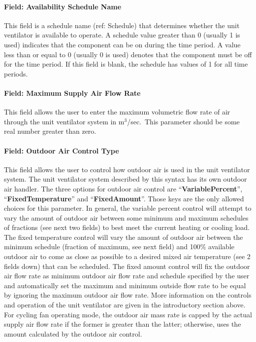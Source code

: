 \paragraph{Field: Availability Schedule Name}\label{field-availability-schedule-name-2-009}

This field is a schedule name (ref: Schedule) that determines whether the unit ventilator is available to operate. A schedule value greater than 0 (usually 1 is used) indicates that the component can be on during the time period. A value less than or equal to 0 (usually 0 is used) denotes that the component must be off for the time period. If this field is blank, the schedule has values of 1 for all time periods.

\paragraph{Field: Maximum Supply Air Flow Rate}\label{field-maximum-supply-air-flow-rate-1}

This field allows the user to enter the maximum volumetric flow rate of air through the unit ventilator system in m\(^{3}\)/sec.~This parameter should be some real number greater than zero.

\paragraph{Field: Outdoor Air Control Type}\label{field-outdoor-air-control-type-000}

This field allows the user to control how outdoor air is used in the unit ventilator system. The unit ventilator system described by this syntax has its own outdoor air handler. The three options for outdoor air control are ``\textbf{VariablePercent}'', ``\textbf{FixedTemperature}'' and ``\textbf{FixedAmount}''. Those keys are the only allowed choices for this parameter. In general, the variable percent control will attempt to vary the amount of outdoor air between some minimum and maximum schedules of fractions (see next two fields) to best meet the current heating or cooling load. The fixed temperature control will vary the amount of outdoor air between the minimum schedule (fraction of maximum, see next field) and 100\% available outdoor air to come as close as possible to a desired mixed air temperature (see 2 fields down) that can be scheduled. The fixed amount control will fix the outdoor air flow rate as minimum outdoor air flow rate and schedule specified by the user and automatically set the maximum and minimum outside flow rate to be equal by ignoring the maximum outdoor air flow rate. More information on the controls and operation of the unit ventilator are given in the introductory section above. For cycling fan operating mode, the outdoor air mass rate is capped by the actual supply air flow rate if the former is greater than the latter; otherwise, uses the amount calculated by the outdoor air control.

